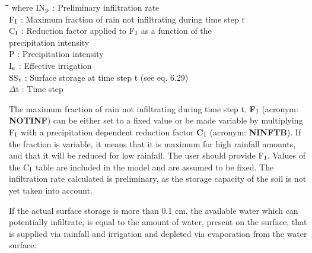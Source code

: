 \documentclass[11pt]{article}
\begin{document}
\nwln
\begin{tabbing}
\hspace{1.27cm}\=\hspace{1.27cm}\=\hspace{1.27cm}\=\hspace{1.27cm}\=%
\hspace{1.27cm}\=\hspace{1.27cm}\=\hspace{1.27cm}\=\hspace{1.27cm}\=%
\hspace{1.27cm}\=\hspace{1.27cm}\=\kill
where\> IN$_{{\rm p}}$\> : Preliminary infiltration rate\> \> \> \> \> \> \> \> [cm d$^{{\rm -1}}$]\\
\>F$_{{\rm I}}$\> : Maximum fraction of rain not infiltrating during time step t\> \> \> \> \> \> \> \> [-]\\
\>C$_{{\rm I}}$\> : Reduction factor applied to F$_{{\rm I}}$ as a function of the \\
\>\>   precipitation intensity\> \> \> \> \> \> \> \> [-]\\
\>P\> : Precipitation intensity\> \> \> \> \> \> \> \> [cm d$^{{\rm -1}}$]\\
\>I$_{{\rm e}}$\> : Effective irrigation\> \> \> \> \> \> \> \> [cm d$^{{\rm -1}}$]\\
\>SS$_{{\rm t}}$\> : Surface storage at time step t (see eq. 6.29)\> \> \> \> \> \> \> \> [cm]\\
\>$\Delta$t\> : Time step\> \> \> \> \> \> \> \> [d]
\end{tabbing}

The maximum fraction of rain not infiltrating during time step t, {\bf F$_{{\rm I}}$} (acronym: {\bf NOTINF})
can be either set to a fixed value or be made variable by multiplying F$_{{\rm I}}$ with a precipita\-tion dependent reduction factor {\bf C$_{{\rm I}}$} (acronym: {\bf NINFTB}). If the fraction is variable, it
means that it is maximum for high rainfall amounts, and that it will be reduced for low
rainfall. The user should provide F$_{{\rm I}}$. Values of the C$_{{\rm I}}$ table are included in the model and
are assumed to be fixed. The infiltration rate calculated is preliminary, as the storage
capacity of the soil is not yet taken into account. 

\bigskip
If the actual surface storage is more than 0.1 cm, the available water which can potential\-ly infiltrate, is equal to the amount of water, present on the surface, that is supplied via
rainfall and irrigation and depleted via evaporation from the water surface:
\end{document}
